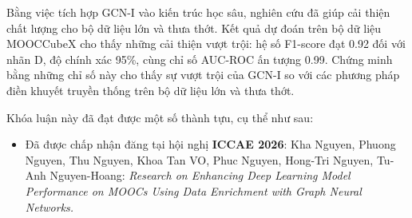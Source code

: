 Bằng việc tích hợp GCN-I vào kiến trúc học sâu, nghiên cứu đã giúp cải thiện chất lượng cho bộ dữ liệu lớn và thưa thớt. Kết quả dự đoán trên bộ dữ liệu MOOCCubeX cho thấy những cải thiện vượt trội: hệ số F1-score đạt 0.92 đối với nhãn D, độ chính xác 95\%, cùng chỉ số AUC-ROC ấn tượng 0.99. Chứng minh bằng những chỉ số này cho thấy sự vượt trội của GCN-I so với các phương pháp điền khuyết truyền thống trên bộ dữ liệu lớn và thưa thớt.

Khóa luận này đã đạt được một số thành tựu, cụ thể như sau:
\begin{itemize}
    \item  Đã được chấp nhận đăng tại hội nghị \textbf{ICCAE 2026}: Kha Nguyen, Phuong Nguyen, Thu Nguyen, Khoa Tan VO, Phuc Nguyen, Hong-Tri Nguyen, Tu-Anh Nguyen-Hoang: \textit{Research on Enhancing Deep Learning Model Performance on MOOCs Using Data Enrichment with Graph Neural Networks.}
\end{itemize}



